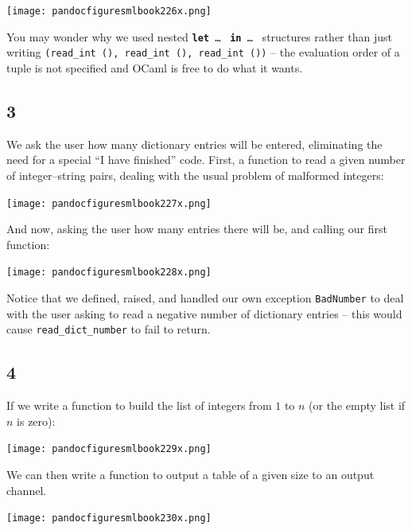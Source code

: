 \documentclass[]{book}
\begin{document}
\medskip
\begin{center}
\noindent\texttt{[image: pandocfiguresmlbook226x.png]}
\end{center}
\medskip

\noindent You may wonder why we used nested \textbf{\texttt{let}}\texttt{ \ldots\ } \textbf{\texttt{in}}\texttt{ \ldots\ } structures rather than just writing \texttt{(read\_int (), read\_int (), read\_int ())} -- the evaluation order of a tuple is not specified and OCaml is free to do what it wants. 

\subsection*{3}
We ask the user how many dictionary entries will be entered, eliminating the need for a special ``I have finished'' code. First, a function to read a given number of integer--string pairs, dealing with the usual problem of malformed integers:

\medskip
\begin{center}
\noindent\texttt{[image: pandocfiguresmlbook227x.png]}
\end{center}
\medskip

\noindent And now, asking the user how many entries there will be, and calling our first function:

\medskip
\begin{center}
\noindent\texttt{[image: pandocfiguresmlbook228x.png]}
\end{center}
\medskip


\noindent Notice that we defined, raised, and handled our own exception \texttt{BadNumber} to deal with the user asking to read a negative number of dictionary entries -- this would cause \texttt{read\_dict\_number} to fail to return.
 
\subsection*{4}
If we write a function to build the list of integers from $1$ to $n$ (or the empty list if $n$ is zero):

\medskip
\begin{center}
\noindent\texttt{[image: pandocfiguresmlbook229x.png]}
\end{center}
\medskip

\noindent We can then write a function to output a table of a given size to an output channel.

\medskip
\begin{center}
\noindent\texttt{[image: pandocfiguresmlbook230x.png]}
\end{center}
\medskip
\end{document}
